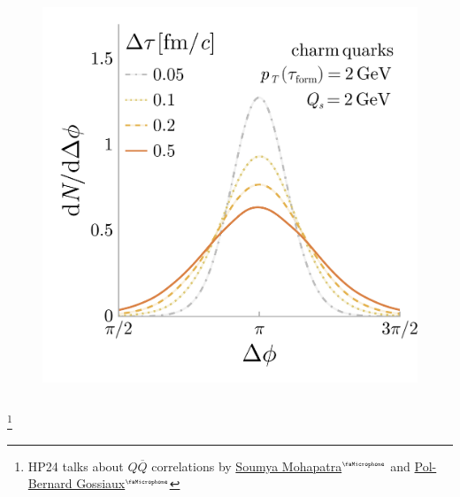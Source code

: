 \documentclass[aspectratio=169,11pt,usenames,dvipsnames]{beamer}
\renewcommand{\thefootnote}{\color{customblue}\faPaperPlaneO}
\newcommand\blfootnote[1]{%
  \begingroup
  \renewcommand\thefootnote{}\footnote{#1}%
  \addtocounter{footnote}{-1}%
  \endgroup
}
\begin{document}
\begin{frame}
\begin{center}
\begin{columns}[onlytextwidth,t]
\begin{center}
                \vspace{-10pt}
                \begin{figure}
                    \centering
                    \includegraphics[width=0.8\columnwidth]{images/final_dNdphi_tau_dep_charm_v2.png}
                \end{figure}
            \end{center}
        \end{columns}    

    \end{center}
    \vspace{-10pt}
    \blfootnote{\scriptsize HP24 talks about $Q\overline{Q}$ correlations by \href{https://indico.cern.ch/event/1339555/contributions/6040884/}{{\color{palgold}Soumya Mohapatra$^\text{\tiny\faMicrophone}$}} and \href{https://indico.cern.ch/event/1339555/contributions/6040863/}{{\color{palgold}Pol-Bernard Gossiaux$^\text{\tiny\faMicrophone}$}}}
\end{frame}


\end{document}
